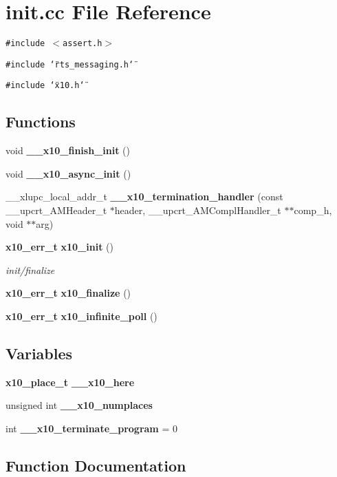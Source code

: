 \section{init.cc File Reference}
\label{init_8cc}
{\tt \#include $<$assert.h$>$}\par
{\tt \#include \char`\"{}rts\_\-messaging.h\char`\"{}}\par
{\tt \#include \char`\"{}x10.h\char`\"{}}\par
\subsection*{Functions}
\begin{CompactItemize}
\item 
void {\bf \_\-\_\-x10\_\-finish\_\-init} ()
\item 
void {\bf \_\-\_\-x10\_\-async\_\-init} ()
\item 
\_\-\_\-xlupc\_\-local\_\-addr\_\-t {\bf \_\-\_\-x10\_\-termination\_\-handler} (const \_\-\_\-upcrt\_\-AMHeader\_\-t $\ast$header, \_\-\_\-upcrt\_\-AMCompl\-Handler\_\-t $\ast$$\ast$comp\_\-h, void $\ast$$\ast$arg)
\item 
{\bf x10\_\-err\_\-t} {\bf x10\_\-init} ()
\begin{CompactList}\small\item\em init/finalize \item\end{CompactList}\item 
{\bf x10\_\-err\_\-t} {\bf x10\_\-finalize} ()
\item 
{\bf x10\_\-err\_\-t} {\bf x10\_\-infinite\_\-poll} ()
\end{CompactItemize}
\subsection*{Variables}
\begin{CompactItemize}
\item 
{\bf x10\_\-place\_\-t} {\bf \_\-\_\-x10\_\-here}
\item 
unsigned int {\bf \_\-\_\-x10\_\-numplaces}
\item 
int {\bf \_\-\_\-x10\_\-terminate\_\-program} = 0
\end{CompactItemize}


\subsection{Function Documentation}
